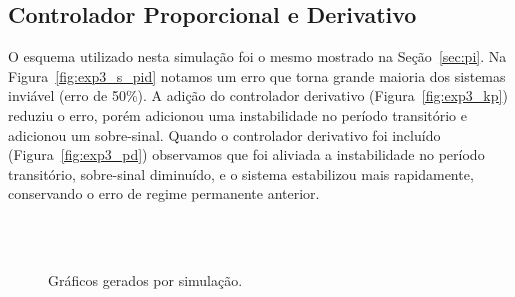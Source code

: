 \documentclass[a4paper]{article}
\begin{document}
\subsection{Controlador Proporcional e Derivativo}
O esquema utilizado nesta simulação foi o mesmo mostrado na Seção~\ref{sec:pi}.
Na Figura~\ref{fig:exp3_s_pid} notamos um erro que torna grande maioria dos sistemas inviável (erro de 50\%).
A adição do controlador derivativo (Figura~\ref{fig:exp3_kp}) reduziu o erro, porém adicionou uma instabilidade
no período transitório e adicionou um sobre-sinal. Quando o controlador derivativo foi incluído (Figura~\ref{fig:exp3_pd})
observamos que foi aliviada a instabilidade no período transitório, sobre-sinal diminuído, e o sistema estabilizou
mais rapidamente, conservando o erro de regime permanente anterior.

\begin{figure}[h]
   \centering
   \\
   \\ 
   \caption{Gráficos gerados por simulação.}
   \label{fig:exp3_simulacao}
\end{figure}
\end{document}
